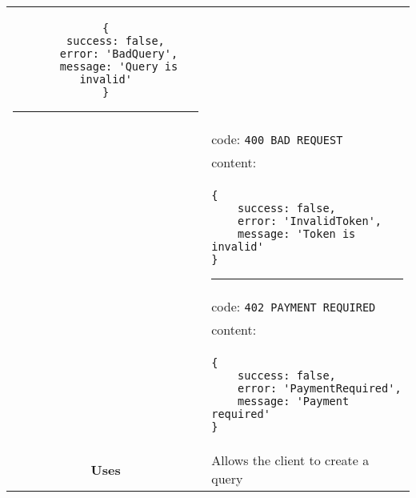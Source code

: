 \begin{adjustwidth}{1cm}{}
\begin{longtable}{|c|l|}
\begin{minipage}[t]{0.7\textwidth}
                \begin{adjustwidth}{1.5cm}{}
                \begin{verbatim}
{
    success: false, 
    error: 'BadQuery',
    message: 'Query is invalid'
}
                \end{verbatim}
                \end{adjustwidth}
                 \par\noindent\rule{\textwidth}{1pt}
                 \vspace{4pt}
              \end{minipage} \\
              &                     code: \texttt{400 BAD REQUEST} \\
              &                     content: \\
              & \begin{minipage}[t]{0.7\textwidth}
                \begin{adjustwidth}{1.5cm}{}
                \begin{verbatim}
{
    success: false, 
    error: 'InvalidToken',
    message: 'Token is invalid'
}
                \end{verbatim}
                \end{adjustwidth}
                \par\noindent\rule{\textwidth}{1pt}
                 \vspace{4pt}
              \end{minipage} \\
              &                     code: \texttt{402 PAYMENT REQUIRED} \\
              &                     content: \\
              & \begin{minipage}[t]{0.7\textwidth}
                \begin{adjustwidth}{1.5cm}{}
                \begin{verbatim}
{
    success: false, 
    error: 'PaymentRequired',
    message: 'Payment required'
}
                \end{verbatim}
                \end{adjustwidth}
              \end{minipage} \\
              \hline
            \textbf{Uses} & Allows the client to create a query \\
            \hline
        \end{longtable}
    \end{adjustwidth} 
    
